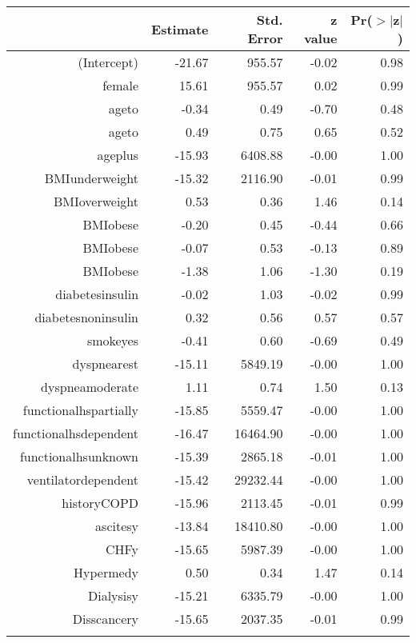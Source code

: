 \bigskip\bigskip
\centering
\begin{tabular}{rrrrr}
  \hline
 & Estimate & Std. Error & z value & Pr($>$$|$z$|$) \\ 
  \hline
(Intercept) & -21.67 & 955.57 & -0.02 & 0.98 \\ 
  female & 15.61 & 955.57 & 0.02 & 0.99 \\ 
  age\-65\-to\-74 & -0.34 & 0.49 & -0.70 & 0.48 \\ 
  age\-75\-to\-84 & 0.49 & 0.75 & 0.65 & 0.52 \\ 
  age\-85\-plus & -15.93 & 6408.88 & -0.00 & 1.00 \\ 
  BMI\-underweight & -15.32 & 2116.90 & -0.01 & 0.99 \\ 
  BMI\-overweight & 0.53 & 0.36 & 1.46 & 0.14 \\ 
  BMI\-obese\-1 & -0.20 & 0.45 & -0.44 & 0.66 \\ 
  BMI\-obese\-2 & -0.07 & 0.53 & -0.13 & 0.89 \\ 
  BMI\-obese\-3 & -1.38 & 1.06 & -1.30 & 0.19 \\ 
  diabetes\-insulin & -0.02 & 1.03 & -0.02 & 0.99 \\ 
  diabetes\-noninsulin & 0.32 & 0.56 & 0.57 & 0.57 \\ 
  smoke\-yes & -0.41 & 0.60 & -0.69 & 0.49 \\ 
  dyspnea\-rest & -15.11 & 5849.19 & -0.00 & 1.00 \\ 
  dyspnea\-moderate & 1.11 & 0.74 & 1.50 & 0.13 \\ 
  functional\-hs\-partially & -15.85 & 5559.47 & -0.00 & 1.00 \\ 
  functional\-hs\-dependent & -16.47 & 16464.90 & -0.00 & 1.00 \\ 
  functional\-hs\-unknown & -15.39 & 2865.18 & -0.01 & 1.00 \\ 
  ventilator\-dependent & -15.42 & 29232.44 & -0.00 & 1.00 \\ 
  history\-COPD & -15.96 & 2113.45 & -0.01 & 0.99 \\ 
  ascites\-y & -13.84 & 18410.80 & -0.00 & 1.00 \\ 
  CHF\-y & -15.65 & 5987.39 & -0.00 & 1.00 \\ 
  Hyper\-med\-y & 0.50 & 0.34 & 1.47 & 0.14 \\ 
  Dialysis\-y & -15.21 & 6335.79 & -0.00 & 1.00 \\ 
  Diss\-cancer\-y & -15.65 & 2037.35 & -0.01 & 0.99 \\ 
$$
\end{tabular}

